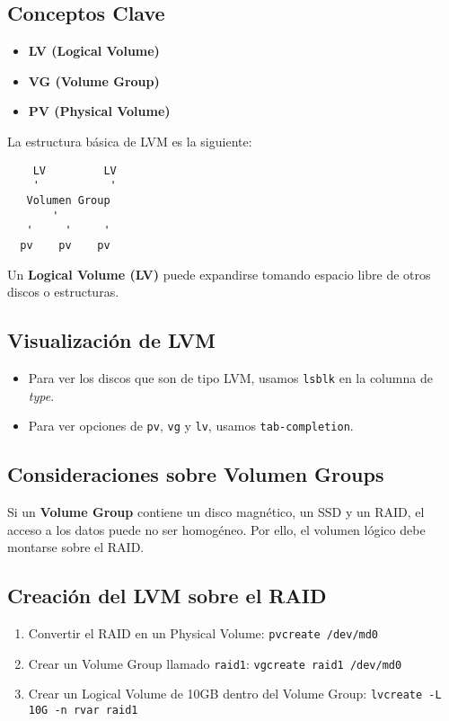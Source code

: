 \subsection{Conceptos Clave}
\begin{itemize}
    \item \textbf{LV (Logical Volume)}
    \item \textbf{VG (Volume Group)}
    \item \textbf{PV (Physical Volume)}
\end{itemize}

La estructura básica de LVM es la siguiente:

\begin{verbatim}
    LV         LV   
    '           '
   Volumen Group  
       '
   '     '     '
  pv    pv    pv  
\end{verbatim}

Un \textbf{Logical Volume (LV)} puede expandirse tomando espacio libre de otros discos o estructuras.

\subsection{Visualización de LVM}
\begin{itemize}
    \item Para ver los discos que son de tipo LVM, usamos \texttt{lsblk} en la columna de \textit{type}.
    \item Para ver opciones de \texttt{pv}, \texttt{vg} y \texttt{lv}, usamos \texttt{tab-completion}.
\end{itemize}

\subsection{Consideraciones sobre Volumen Groups}
Si un \textbf{Volume Group} contiene un disco magnético, un SSD y un RAID, el acceso a los datos puede no ser homogéneo. Por ello, el volumen lógico debe montarse sobre el RAID.

\subsection{Creación del LVM sobre el RAID}
\begin{enumerate}
    \item Convertir el RAID en un Physical Volume:
          \texttt{pvcreate /dev/md0}
    \item Crear un Volume Group llamado \texttt{raid1}:
          \texttt{vgcreate raid1 /dev/md0}
    \item Crear un Logical Volume de 10GB dentro del Volume Group:
          \texttt{lvcreate -L 10G -n rvar raid1}
\end{enumerate}

